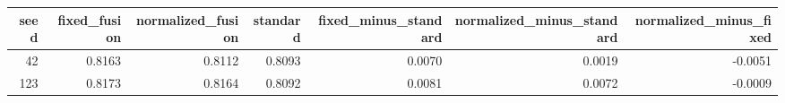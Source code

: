 \begin{tabular}{rrrrrrr}
\toprule
seed & fixed_fusion & normalized_fusion & standard & fixed_minus_standard & normalized_minus_standard & normalized_minus_fixed \\
\midrule
42 & 0.8163 & 0.8112 & 0.8093 & 0.0070 & 0.0019 & -0.0051 \\
123 & 0.8173 & 0.8164 & 0.8092 & 0.0081 & 0.0072 & -0.0009 \\
\bottomrule
\end{tabular}
